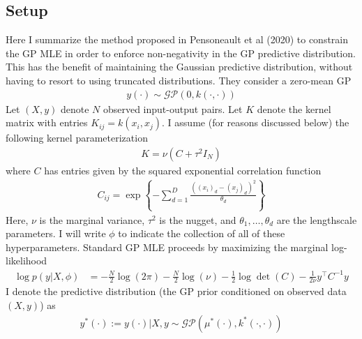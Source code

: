 \documentclass[12pt]{article}
\begin{document}
\subsection{Setup}
Here I summarize the method proposed in Pensoneault et al (2020) to constrain the GP MLE in order to enforce non-negativity in the GP predictive 
distribution. This has the benefit of maintaining the Gaussian predictive distribution, without having to resort to using truncated distributions. 
They consider a zero-mean GP 
\begin{align*}
y(\cdot) \sim \mathcal{GP}(0, k(\cdot, \cdot)) 
\end{align*}
Let $(X, y)$ denote $N$ observed input-output pairs. Let $K$ denote the kernel matrix with entries $K_{ij} = k(x_i, x_j)$. 
I assume (for reasons discussed below) the following kernel parameterization 
\begin{align*}
K = \nu\left(C + \tau^2 I_N \right)
\end{align*}
where $C$ has entries given by the squared exponential correlation function 
\begin{align*}
C_{ij} = \exp\left\{-\sum_{d = 1}^{D} \frac{((x_i)_d - (x_j)_d)^2}{\theta_d} \right\}
\end{align*}
Here, $\nu$ is the marginal variance, $\tau^2$ is the nugget, and $\theta_1, \dots, \theta_d$ are the lengthscale parameters. I will write 
$\phi$ to indicate the collection of all of these hyperparameters. 
Standard GP MLE proceeds by maximizing the marginal log-likelihood
\begin{align*}
\log p(y|X, \phi) &= -\frac{N}{2}  \log(2\pi) - \frac{N}{2}\log(\nu) - \frac{1}{2} \log \det(C) - \frac{1}{2\nu} y^\top C^{-1}y
\end{align*}
I denote the predictive distribution (the GP prior conditioned on observed data $(X, y)$) as 
\begin{align*}
y^*(\cdot) := y(\cdot)|X, y \sim \mathcal{GP}(\mu^*(\cdot), k^*(\cdot, \cdot)) 
\end{align*}
\end{document}
